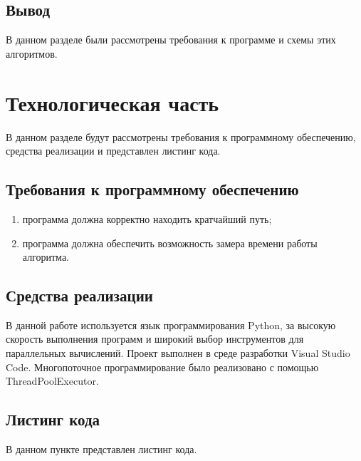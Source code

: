 \documentclass[a4paper, 12pt]{article}
\begin{document}
	\subsection{Вывод}
	\hspace*{5mm} В данном разделе были рассмотрены требования к программе и схемы этих алгоритмов. 


\newpage
\section{Технологическая часть}

	\hspace*{5mm} В данном разделе будут рассмотрены требования к программному обеспечению, средства реализации и представлен листинг кода.
	\subsection{Требования к программному обеспечению}
		\begin{enumerate}
		\item программа должна корректно находить кратчайший путь;
		\item программа должна обеспечить возможность замера времени работы алгоритма. 
	\end{enumerate}
	\subsection{Средства реализации}
	\hspace*{5mm} В данной работе используется язык программирования Python, за высокую скорость выполнения программ и широкий выбор инструментов для параллельных вычислений. Проект выполнен в среде разработки Visual Studio Code. Многопоточное программирование было реализовано с помощью ThreadPoolExecutor. \cite{doc}
	\clearpage
	\newpage 
	\subsection{Листинг кода}
	В данном пункте представлен листинг кода.

\end{document}
